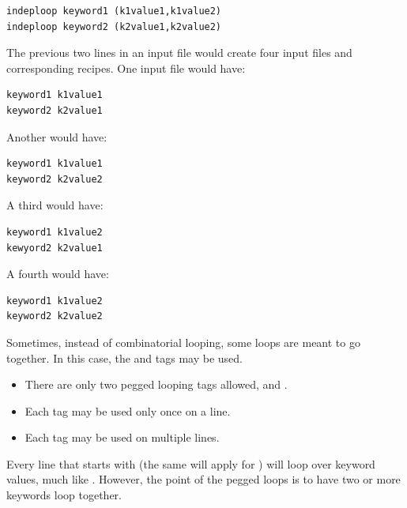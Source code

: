 \documentclass[letterpaper,10pt,english]{sphinxmanual}
\begin{document}
\begin{Verbatim}[commandchars=\\\{\}]
indeploop keyword1 (k1value1,k1value2)
indeploop keyword2 (k2value1,k2value2)
\end{Verbatim}

The previous two lines in an input file would create four input files and corresponding recipes.
One input file would have:

\begin{Verbatim}[commandchars=\\\{\}]
keyword1 k1value1
keyword2 k2value1
\end{Verbatim}

Another would have:

\begin{Verbatim}[commandchars=\\\{\}]
keyword1 k1value1
keyword2 k2value2
\end{Verbatim}

A third would have:

\begin{Verbatim}[commandchars=\\\{\}]
keyword1 k1value2
kewyord2 k2value1
\end{Verbatim}

A fourth would have:

\begin{Verbatim}[commandchars=\\\{\}]
keyword1 k1value2
keyword2 k2value2
\end{Verbatim}

Sometimes, instead of combinatorial looping, some loops are meant to go together. In this case, the  and  tags may be used.
\begin{itemize}
\item {} 
There are only two pegged looping tags allowed,  and .

\item {} 
Each tag may be used only once on a line.

\item {} 
Each tag may be used on multiple lines.

\end{itemize}

Every line that starts with  (the same will apply for ) will loop over keyword values, much like . However, the point of the pegged loops is to have two or more keywords loop together.
\end{document}
